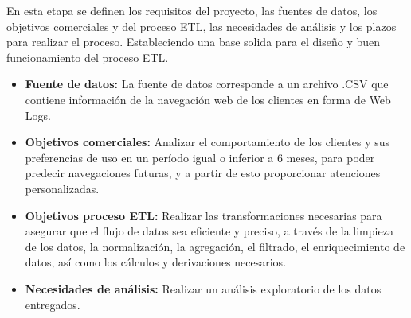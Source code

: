 En esta etapa se definen los requisitos del proyecto, las fuentes de datos, los objetivos comerciales y del proceso ETL, las necesidades de análisis y los plazos para realizar el proceso. Estableciendo una base solida para el diseño y buen funcionamiento del proceso ETL.
\begin{itemize}
    \item \textbf{Fuente de datos:} La fuente de datos corresponde a un archivo .CSV que contiene información de la navegación web de los clientes en forma de Web Logs.
    \item \textbf{Objetivos comerciales:} Analizar el comportamiento de los clientes y sus preferencias de uso en un período igual o inferior a 6 meses, para poder predecir navegaciones futuras, y a partir de esto proporcionar atenciones personalizadas.
    \item \textbf{Objetivos proceso ETL:} Realizar las transformaciones necesarias para asegurar que el flujo de datos sea eficiente y preciso, a través de la limpieza de los datos, la normalización, la agregación, el filtrado, el enriquecimiento de datos, así como los cálculos y derivaciones necesarios.
    \item \textbf{Necesidades de análisis:} Realizar un análisis exploratorio de los datos entregados.
\end{itemize}
